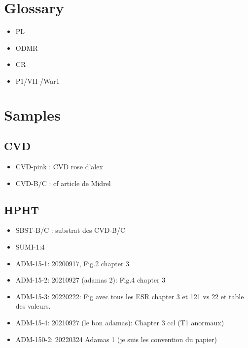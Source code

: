\documentclass[a4paper]{article}
\begin{document}
\section{Glossary}
\begin{itemize}
\item PL
\item ODMR
\item CR
\item P1/VH-/War1
\end{itemize}
\section{Samples}
\subsection{CVD}
\begin{itemize}
\item CVD-pink : CVD rose d'alex
\item CVD-B/C : cf article de Midrel
\end{itemize}
\subsection{HPHT}
\begin{itemize}
\item SBST-B/C : substrat des CVD-B/C
\item SUMI-1:4
\item ADM-15-1: 20200917, Fig.2 chapter 3
\item ADM-15-2: 20210927 (adamas 2): Fig.4 chapter 3
\item ADM-15-3: 20220222: Fig avec tous les ESR chapter 3 et 121 vs 22 et table des valeurs.
\item ADM-15-4: 20210927 (le bon adamas): Chapter 3 ccl (T1 anormaux)
\item ADM-150-2: 20220324 Adamas 1 (je suis les convention du papier)
\end{itemize}
\end{document}
